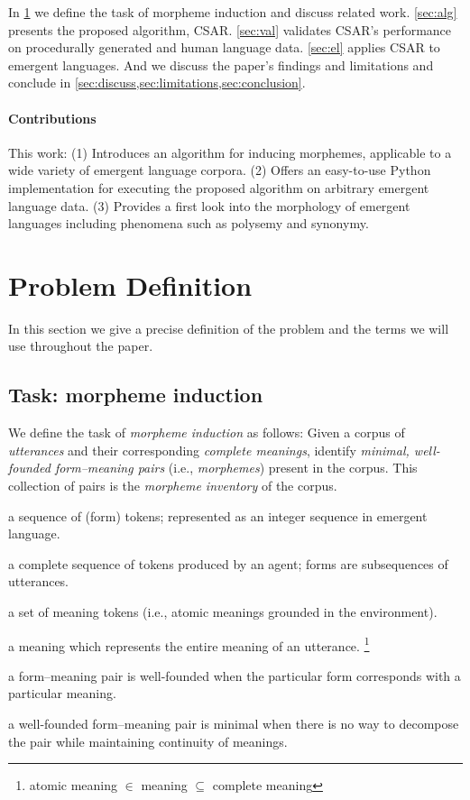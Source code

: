 In \cref{sec:prob} we define the task of morpheme induction and discuss related work.
\cref{sec:alg} presents the proposed algorithm, CSAR\@.
\cref{sec:val} validates CSAR's performance on procedurally generated and human language data.
\cref{sec:el} applies CSAR to emergent languages.
And we discuss the paper's findings and limitations and conclude in \cref{sec:discuss,sec:limitations,sec:conclusion}.


\paragraph{Contributions}
This work:
(1) Introduces an algorithm for inducing morphemes, applicable to a wide variety of emergent language corpora.
(2) Offers an easy-to-use Python implementation for executing the proposed algorithm on arbitrary emergent language data.
(3) Provides a first look into the morphology of emergent languages including phenomena such as polysemy and synonymy.



\section{Problem Definition}%
\label{sec:prob}
In this section we give a precise definition of the problem and the terms we will use throughout the paper.

\subsection{Task: morpheme induction}
We define the task of \emph{morpheme induction} as follows:
Given a corpus of \emph{utterances} and their corresponding \emph{complete meanings}, identify \emph{minimal, well-founded form--meaning pairs} (i.e., \emph{morphemes}) present in the corpus.
This collection of pairs is the \emph{morpheme inventory} of the corpus.

\smallskip
\begin{description}[nosep,itemindent=-1em]
  \item[form] a sequence of (form) tokens; represented as an integer sequence in emergent language.
  \item[utterance] a complete sequence of tokens produced by an agent; forms are subsequences of utterances.
  \item[meaning] a set of meaning tokens (i.e., atomic meanings grounded in the environment).
  \item[complete meaning] a meaning which represents the entire meaning of an utterance.
    \unskip\footnote{atomic meaning $\in$ meaning $\subseteq$ complete meaning}
  \item[well-founded] a form--meaning pair is well-founded when the particular form corresponds with a particular meaning.
  \item[minimal] a well-founded form--meaning pair is minimal when there is no way to decompose the pair while maintaining continuity of meanings.
\end{description}
\medskip

